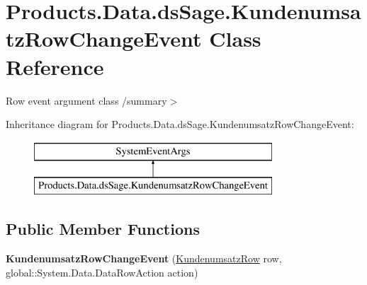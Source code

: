 \hypertarget{class_products_1_1_data_1_1ds_sage_1_1_kundenumsatz_row_change_event}{}\section{Products.\+Data.\+ds\+Sage.\+Kundenumsatz\+Row\+Change\+Event Class Reference}
\label{class_products_1_1_data_1_1ds_sage_1_1_kundenumsatz_row_change_event}


Row event argument class /summary$>$  


Inheritance diagram for Products.\+Data.\+ds\+Sage.\+Kundenumsatz\+Row\+Change\+Event\+:\begin{figure}[H]
\begin{center}
\leavevmode
\includegraphics[height=2.000000cm]{class_products_1_1_data_1_1ds_sage_1_1_kundenumsatz_row_change_event}
\end{center}
\end{figure}
\subsection*{Public Member Functions}
\begin{DoxyCompactItemize}
\item 
{\bfseries Kundenumsatz\+Row\+Change\+Event} (\hyperlink{class_products_1_1_data_1_1ds_sage_1_1_kundenumsatz_row}{Kundenumsatz\+Row} row, global\+::\+System.\+Data.\+Data\+Row\+Action action)\hypertarget{class_products_1_1_data_1_1ds_sage_1_1_kundenumsatz_row_change_event_a7a72a29e9f3d5e555f6642a64683c61d}{}\label{class_products_1_1_data_1_1ds_sage_1_1_kundenumsatz_row_change_event_a7a72a29e9f3d5e555f6642a64683c61d}

\end{DoxyCompactItemize}
